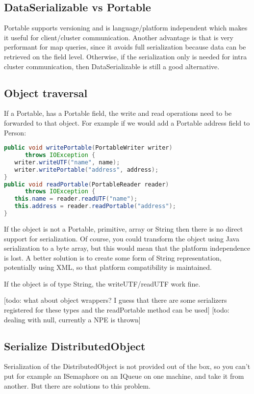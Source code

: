 \subsection{DataSerializable vs Portable}
Portable supports versioning and is language/platform independent which makes it useful for client/cluster communication. Another advantage is that is very performant for map queries, since it avoids full serialization because data can be retrieved on the field level. Otherwise, if the serialization only is needed for intra cluster communication, then DataSerializable is still a good alternative.

\subsection*{Object traversal}
If a Portable, has a Portable field, the write and read operations need to be forwarded to that object. For example if we would add a Portable address field to Person:
\begin{lstlisting}[language=java]
public void writePortable(PortableWriter writer) 
      throws IOException {
   writer.writeUTF("name", name);
   writer.writePortable("address", address);
}
public void readPortable(PortableReader reader) 
      throws IOException {
   this.name = reader.readUTF("name");
   this.address = reader.readPortable("address");
}
\end{lstlisting}
If the object is not a Portable, primitive, array or String then there is no direct support for serialization. Of course, you could transform the object using Java serialization to a byte array, but this would mean that the platform independence is lost. A better solution  is to create some form of String representation, potentially using XML, so that platform compatibility is maintained.

If the object is of type String, the writeUTF/readUTF work fine. 

[todo: what about object wrappers? I guess that there are some serializers registered for these types and the readPortable method can be used]
[todo: dealing with null, currently a NPE is thrown]

\subsection*{Serialize DistributedObject}
Serialization of the DistributedObject is not provided out of the box, so you can't put for example an ISemaphore on an IQueue on one machine, and take it from another. But there are solutions to this problem.

